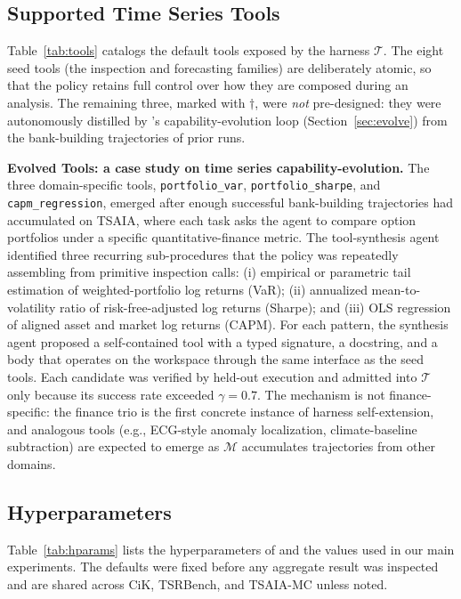 \subsection{Supported Time Series Tools}
\label{app:tools}



Table~\ref{tab:tools} catalogs the default tools exposed by the harness $\mathcal{T}$. The eight seed tools (the inspection and forecasting families) are deliberately atomic, so that the policy retains full control over how they are composed during an analysis. The remaining three, marked with $\dagger$, were \emph{not} pre-designed: they were autonomously distilled by \method's capability-evolution loop (Section~\ref{sec:evolve}) from the bank-building trajectories of prior runs.

\noindent\textbf{Evolved Tools: a case study on time series capability-evolution.} 
The three domain-specific tools, \texttt{portfolio\_var}, \texttt{portfolio\_sharpe}, and \texttt{capm\_regression}, emerged after enough successful bank-building trajectories had accumulated on TSAIA, where each task asks the agent to compare option portfolios under a specific quantitative-finance metric. The tool-synthesis agent identified three recurring sub-procedures that the policy was repeatedly assembling from primitive inspection calls: (i) empirical or parametric tail estimation of weighted-portfolio log returns (VaR); (ii) annualized mean-to-volatility ratio of risk-free-adjusted log returns (Sharpe); and (iii) OLS regression of aligned asset and market log returns (CAPM). For each pattern, the synthesis agent proposed a self-contained tool with a typed signature, a docstring, and a body that operates on the workspace through the same interface as the seed tools. Each candidate was verified by held-out execution and admitted into $\mathcal{T}$ only because its success rate exceeded $\gamma = 0.7$. The mechanism is not finance-specific: the finance trio is the first concrete instance of harness self-extension, and analogous tools (e.g., ECG-style anomaly localization, climate-baseline subtraction) are expected to emerge as $\mathcal{M}$ accumulates trajectories from other domains.




\subsection{Hyperparameters}
\label{app:hparams}

Table~\ref{tab:hparams} lists the hyperparameters of \method and the values used in our main experiments. The defaults were fixed before any aggregate result was inspected and are shared across CiK, TSRBench, and TSAIA-MC unless noted.


